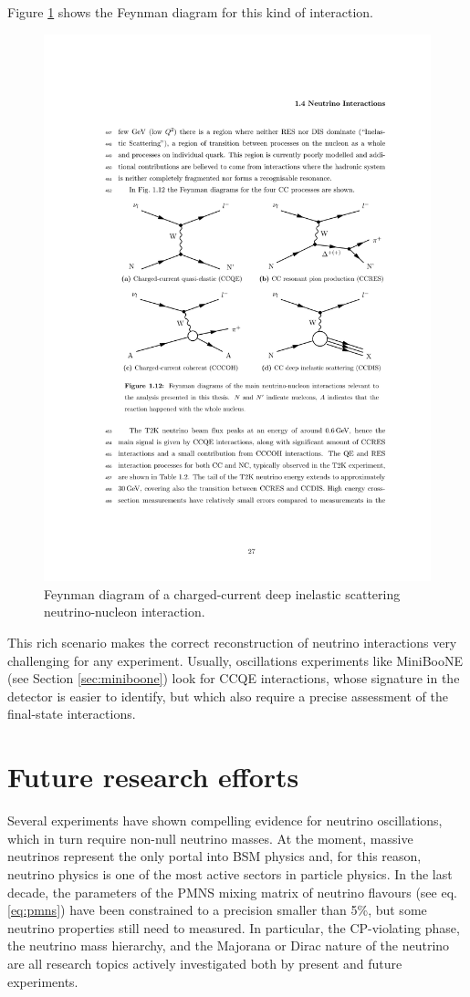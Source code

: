 \begin{description}
Figure \ref{fig:ccdis_feyn} shows the Feynman diagram for this kind of interaction.

\begin{figure}[htbp]
    \centering
    \includegraphics[width=0.65\linewidth]{figures/ccdis_feyn.pdf}
    \caption{Feynman diagram of a charged-current deep inelastic scattering neutrino-nucleon interaction.}
    \label{fig:ccdis_feyn}
\end{figure}


\end{description}

This rich scenario makes the correct reconstruction of neutrino interactions very challenging for any experiment. Usually, oscillations experiments like MiniBooNE (see Section \ref{sec:miniboone}) look for CCQE interactions, whose signature in the detector is easier to identify, but which also require a precise assessment of the final-state interactions.

\section{Future research efforts}
Several experiments have shown compelling evidence for neutrino oscillations, which in turn require non-null neutrino masses. At the moment, massive neutrinos represent the only portal into BSM physics and, for this reason, neutrino physics is one of the most active sectors in particle physics. In the last decade, the parameters of the PMNS mixing matrix of neutrino flavours (see eq. \eqref{eq:pmns}) have been constrained to a precision smaller than 5\%, but some neutrino properties still need to measured. In particular, the CP-violating phase, the neutrino mass hierarchy, and the Majorana or Dirac nature of the neutrino are all research topics actively investigated both by present and future experiments. 

